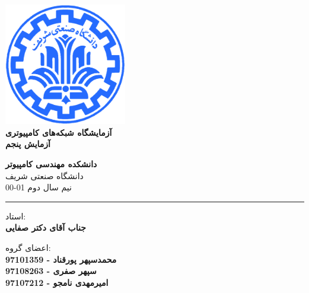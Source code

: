 \documentclass[12pt]{article}
\begin{document}
\begin{titlepage}
\begin{center}
        
\vspace*{0.7cm}

\includegraphics[width=0.4\textwidth]{sharif1.png}\\
\vspace{0.5cm}
\textbf{ \Huge{\emph ‌آزمایشگاه شبکه‌های کامپیوتری} }\\
\vspace{0.5cm}
\textbf{ \Large{ آزمایش پنجم} }
\vspace{0.2cm}
       
 
      \large \textbf{دانشکده مهندسی کامپیوتر}\\\vspace{0.2cm}
    \large   دانشگاه صنعتی شریف\\\vspace{0.2cm}
       \large   ﻧﯿﻢ سال دوم 01-00 \\\vspace{0.2cm}
      \noindent\rule[1ex]{\linewidth}{1pt}
استاد:\\
    \textbf{{جناب آقای دکتر صفایی}}


    \vspace{0.15cm}
اعضای گروه:\\

    \textbf{{محمدسپهر پورقناد - 97101359}}
    \\
   
    \textbf{{سپهر صفری - 97108263}}       
   \\
   
    \textbf{{امیرمهدی نامجو - 97107212}}
\end{center}
\end{titlepage}


\newpage
\pagestyle{fancy}
\fancyhf{}
\fancyfoot{}
\cfoot{\thepage}
\chead{}
\end{document}
